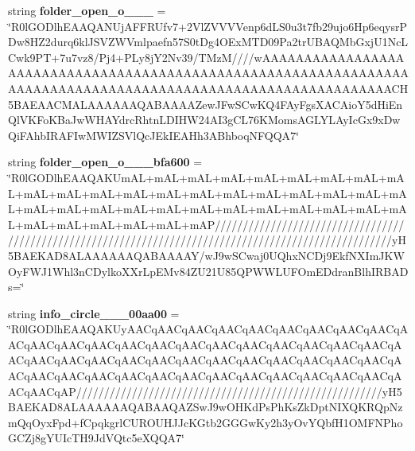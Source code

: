 \begin{DoxyCompactItemize}
string {\bfseries folder\+\_\+open\+\_\+o\+\_\+\_\+\_} = \char`\"{}R0l\+G\+O\+Dlh\+E\+A\+A\+Q\+A\+N\+Uj\+A\+F\+F\+R\+Ufv7+2\+Vl\+Z\+V\+V\+V\+Venp6d\+L\+S0u3t7fb29ujo6\+Hp6eqysr\+P\+Dw8\+H\+Z2durq6kl\+J\+S\+V\+Z\+W\+Vmlpaefn57\+S0t\+Dg4\+O\+Ex\+M\+T\+D09\+Pa2tr\+U\+B\+A\+Q\+Mb\+Gxj\+U1\+Nc\+L\+Cwk9\+P\+T+7u7vz8/\+Pj4+\+P\+Ly8j\+Y2\+Nv39/\+T\+Mz\+M////w\+A\+A\+A\+A\+A\+A\+A\+A\+A\+A\+A\+A\+A\+A\+A\+A\+A\+A\+A\+A\+A\+A\+A\+A\+A\+A\+A\+A\+A\+A\+A\+A\+A\+A\+A\+A\+A\+A\+A\+A\+A\+A\+A\+A\+A\+A\+A\+A\+A\+A\+A\+A\+A\+A\+A\+A\+A\+A\+A\+A\+A\+A\+A\+A\+A\+A\+A\+A\+A\+A\+A\+A\+A\+A\+A\+A\+A\+A\+A\+A\+A\+A\+A\+A\+A\+A\+A\+A\+A\+A\+A\+A\+A\+A\+A\+A\+A\+A\+A\+A\+A\+A\+A\+A\+A\+A\+A\+A\+A\+A\+A\+C\+H5\+B\+A\+E\+A\+A\+C\+M\+A\+L\+A\+A\+A\+A\+A\+A\+Q\+A\+B\+A\+A\+A\+A\+Zew\+J\+Fw\+S\+Cw\+K\+Q4\+F\+Ay\+Fgs\+X\+A\+C\+Aio\+Y5d\+Hi\+En\+Ql\+V\+K\+Fo\+K\+Ba\+Jw\+W\+H\+A\+Ydrc\+Rhtn\+L\+D\+I\+H\+W24\+A\+I3g\+C\+L76\+K\+Moms\+A\+G\+L\+Y\+L\+Ay\+Ic\+Gx9x\+Dw\+Qi\+F\+Ahb\+I\+R\+A\+F\+Iw\+M\+W\+I\+Z\+S\+Vl\+Qc\+J\+Ek\+I\+E\+A\+Hh3\+A\+Bhboq\+N\+F\+Q\+Q\+A7\char`\"{}
\item 
\mbox{\label{class_c_utils_1_1_utils_1_1_resources_1_1_icons_a0388770817b17ab7e96a521756146b17}} 
string {\bfseries folder\+\_\+open\+\_\+o\+\_\+\_\+\_\+bfa600} = \char`\"{}R0l\+G\+O\+Dlh\+E\+A\+A\+Q\+A\+K\+Um\+AL+m\+AL+m\+AL+m\+AL+m\+AL+m\+AL+m\+AL+m\+AL+m\+AL+m\+AL+m\+AL+m\+AL+m\+AL+m\+AL+m\+AL+m\+AL+m\+AL+m\+AL+m\+AL+m\+AL+m\+AL+m\+AL+m\+AL+m\+AL+m\+AL+m\+AL+m\+AL+m\+AL+m\+AL+m\+AL+m\+AL+m\+AL+m\+AL+m\+AL+m\+AL+m\+AL+m\+AL+m\+AL+m\+AP///////////////////////////////////////////////////////////////////////////////////////////////////////y\+H5\+B\+A\+E\+K\+A\+D8\+A\+L\+A\+A\+A\+A\+A\+A\+Q\+A\+B\+A\+A\+A\+AY/w\+J9w\+S\+Cwaj0\+U\+Qhx\+N\+C\+Dj9\+Ekf\+N\+X\+Im\+J\+K\+W\+Oy\+F\+W\+J1\+Whl3n\+C\+Dylko\+X\+Xr\+Lp\+E\+Mv84\+Z\+U21\+U85\+Q\+P\+W\+W\+L\+U\+F\+Om\+E\+Ddran\+Blh\+I\+R\+B\+A\+Ds=\char`\"{}
\item 
\mbox{\label{class_c_utils_1_1_utils_1_1_resources_1_1_icons_a71773fac9f40ecfa566df34ef1d9bb85}} 
string {\bfseries info\+\_\+circle\+\_\+\_\+\_\+00aa00} = \char`\"{}R0l\+G\+O\+Dlh\+E\+A\+A\+Q\+A\+K\+Uy\+A\+A\+Cq\+A\+A\+Cq\+A\+A\+Cq\+A\+A\+Cq\+A\+A\+Cq\+A\+A\+Cq\+A\+A\+Cq\+A\+A\+Cq\+A\+A\+Cq\+A\+A\+Cq\+A\+A\+Cq\+A\+A\+Cq\+A\+A\+Cq\+A\+A\+Cq\+A\+A\+Cq\+A\+A\+Cq\+A\+A\+Cq\+A\+A\+Cq\+A\+A\+Cq\+A\+A\+Cq\+A\+A\+Cq\+A\+A\+Cq\+A\+A\+Cq\+A\+A\+Cq\+A\+A\+Cq\+A\+A\+Cq\+A\+A\+Cq\+A\+A\+Cq\+A\+A\+Cq\+A\+A\+Cq\+A\+A\+Cq\+A\+A\+Cq\+A\+A\+Cq\+A\+A\+Cq\+A\+A\+Cq\+A\+A\+Cq\+A\+A\+Cq\+A\+A\+Cq\+A\+A\+Cq\+A\+A\+Cq\+A\+A\+Cq\+A\+A\+Cq\+A\+A\+Cq\+A\+A\+Cq\+A\+A\+Cq\+A\+A\+Cq\+A\+A\+Cq\+A\+A\+Cq\+A\+A\+Cq\+A\+A\+Cq\+AP///////////////////////////////////////////////////////y\+H5\+B\+A\+E\+K\+A\+D8\+A\+L\+A\+A\+A\+A\+A\+A\+Q\+A\+B\+A\+A\+Q\+A\+Z\+Sw\+J9w\+O\+H\+Kd\+Ps\+Ph\+Ks\+Zk\+Dpt\+N\+I\+X\+Q\+K\+R\+Qp\+Nzm\+Qq\+Oyx\+Fpd+f\+Cpqkgrl\+C\+U\+R\+O\+U\+H\+J\+Jc\+K\+Gtb2\+G\+G\+Gw\+Ky2h3y\+Ov\+Y\+Qbf\+H1\+O\+M\+F\+N\+Pho\+G\+C\+Zj8g\+Y\+U\+Ic\+T\+H9\+Jd\+V\+Qtc5e\+X\+Q\+Q\+A7\char`\"{}

\end{DoxyCompactItemize}
